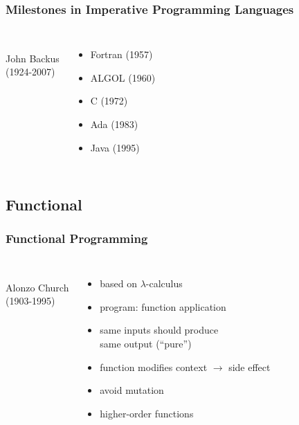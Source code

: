 \documentclass[dvipsnames]{beamer}
\theoremstyle{plain}
\begin{document}
\begin{frame}
  \frametitle{Milestones in Imperative Programming Languages}

  \begin{columns}
    \begin{center}
      \\
      John Backus\\
      (1924-2007)
    \end{center}

    \begin{itemize}
      \item Fortran (1957)
      \item ALGOL (1960)
      \item C (1972)
      \item Ada (1983)
      \item Java (1995)
    \end{itemize}
  \end{columns}
\end{frame}

\subsection{Functional}

\begin{frame}
  \frametitle{Functional Programming}

  \begin{columns}
    \begin{center}
      \\
      Alonzo Church\\
      (1903-1995)
    \end{center}

    \begin{itemize}
      \item based on $\lambda$-calculus
      \smallskip
      \item program: function application
      \item same inputs should produce\\
        same output (``pure'')
      \item function modifies context $\rightarrow$ \alert{side effect}

      \pause
      \smallskip
      \item avoid mutation
      \item higher-order functions
    \end{itemize}
  \end{columns}
\end{frame}
\end{document}
